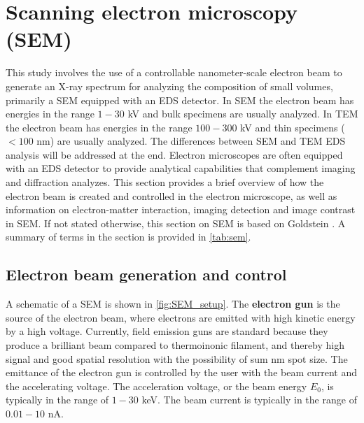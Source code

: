 %



























\clearpage

\section{Scanning electron microscopy (SEM)}
\label{theory:sem}

This study involves the use of a controllable nanometer-scale electron beam to generate an X-ray spectrum for analyzing the composition of small volumes, primarily a SEM equipped with an EDS detector.
In SEM the electron beam has energies in the range $1-30$ kV and bulk specimens are usually analyzed.
In TEM the electron beam has energies in the range $100-300$ kV and thin specimens ($<100$ nm) are usually analyzed.
The differences between SEM and TEM EDS analysis will be addressed at the end.
Electron microscopes are often equipped with an EDS detector to provide analytical capabilities that complement imaging and diffraction analyzes.
This section provides a brief overview of how the electron beam is created and controlled in the electron microscope, as well as information on electron-matter interaction, imaging detection and image contrast in SEM.
If not stated otherwise, this section on SEM is based on Goldstein \cite{goldstein_scanning_2018}.
A summary of terms in the section is provided in \cref{tab:sem}.


\subsection{Electron beam generation and control}
\label{theory:sem:setup}

A schematic of a SEM is shown in \cref{fig:SEM_setup}. The \textbf{electron gun} is the source of the electron beam, where electrons are emitted with high kinetic energy by a high voltage.
Currently, field emission guns are standard because they produce a brilliant beam compared to thermoinonic filament, and thereby high signal and good spatial resolution with the possibility of sum nm spot size.
The emittance of the electron gun is controlled by the user with the beam current and the accelerating voltage.
The acceleration voltage, or the beam energy $E_0$, is typically in the range of $1-30$ keV.
The beam current is typically in the range of $0.01-10$ nA.


